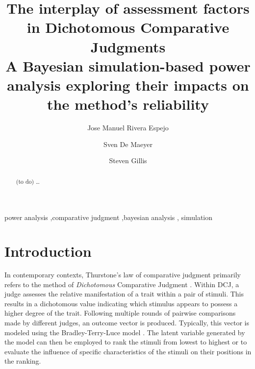 \documentclass[
  authoryear,
  preprint,
  1p]{elsarticle}
\begin{document}
\begin{frontmatter}
\title{The interplay of assessment factors in Dichotomous Comparative
Judgments \\\large{A Bayesian simulation-based power analysis exploring
their impacts on the method's reliability} }
\author[1]{Jose Manuel Rivera Espejo%
%
}
\author[1]{Sven De Maeyer%
%
}
\author[2]{Steven Gillis%
%
}





        
\begin{abstract}
(to do) \ldots{}
\end{abstract}





\begin{keyword}
    power analysis \sep comparative judgment \sep bayesian
analysis \sep 
    simulation
\end{keyword}
\end{frontmatter}
    
\section{Introduction}\label{sec-introduction}

In contemporary contexts, Thurstone's law of comparative judgment
\citeyearpar{Thurstone_1927} primarily refers to the method of
\emph{Dichotomous} Comparative Judgment
\citep[DCJ,][]{Pollitt_2012a, Pollitt_2012b}. Within DCJ, a judge
assesses the relative manifestation of a trait within a pair of stimuli.
This results in a dichotomous value indicating which stimulus appears to
possess a higher degree of the trait. Following multiple rounds of
pairwise comparisons made by different judges, an outcome vector is
produced. Typically, this vector is modeled using the Bradley-Terry-Luce
model \citep[BTL
model,][]{Bradley_et_al_1952, Luce_1959, Pollitt_2012a}. The latent
variable generated by the model can then be employed to rank the stimuli
from lowest to highest or to evaluate the influence of specific
characteristics of the stimuli on their positions in the ranking.
\end{document}
